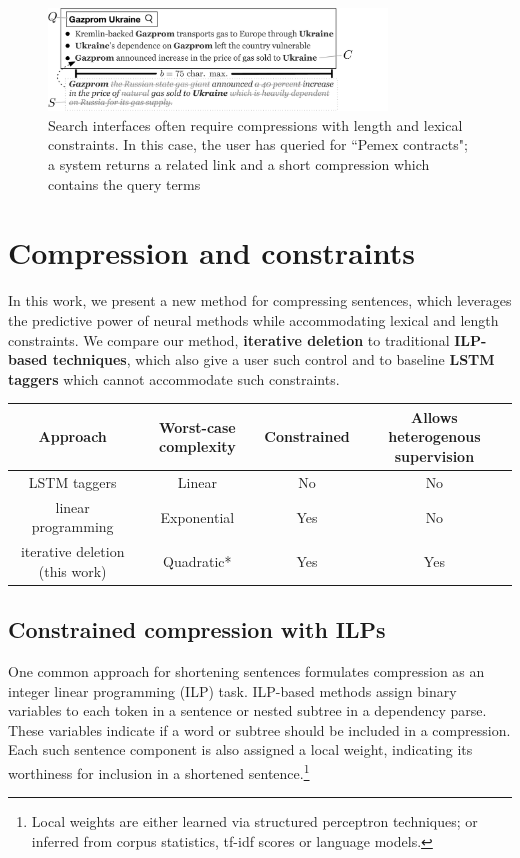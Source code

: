 \documentclass[11pt,a4paper]{article}
\begin{document}
\begin{figure}[htb!]
\includegraphics[width=9cm]{qf.pdf}
\caption{Search interfaces often require compressions with length and lexical constraints. In this case, the user has queried for ``Pemex contracts"; a system returns a related link and a short compression which contains the query terms}
\end{figure}


\section{Compression and constraints}

In this work, we present a new method for compressing sentences, which leverages the predictive power of neural methods while accommodating lexical and length constraints. We compare our method, \textbf{iterative deletion} to traditional \textbf{ILP-based techniques}, which also give a user such control and to baseline \textbf{LSTM taggers} which cannot accommodate such constraints.


\begin{table}[htb!]
\begin{tabular}{cccc}
\textbf{Approach} & \textbf{Worst-case complexity} & \textbf{Constrained} & \textbf{Allows heterogenous supervision} \\ \hline
LSTM taggers      & Linear              & No     &    No      \\   
linear programming              & Exponential         & Yes    &    No   \\
iterative deletion (this work)       & Quadratic*           & Yes    &      Yes   \\
\end{tabular}
\end{table}

\subsection{Constrained compression with ILPs}

One common approach for shortening sentences formulates compression as an integer linear programming (ILP) task. ILP-based methods assign binary variables to each token in a sentence or nested subtree in a dependency parse. These variables indicate if a word or subtree should be included in a compression. Each such sentence component is also assigned a local weight, indicating its worthiness for inclusion in a shortened sentence.\footnote{Local weights are either learned via structured perceptron techniques; or inferred from corpus statistics, tf-idf scores or language models.}
\end{document}
